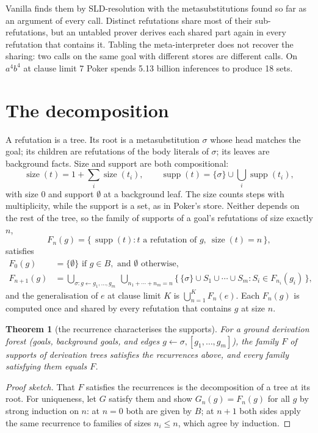 \documentclass[11pt]{article}
\newtheorem{theorem}{Theorem}
\newcommand{\supp}{\operatorname{supp}}
\newcommand{\size}{\operatorname{size}}
\newcommand{\F}{F}
\begin{document}
Vanilla finds them by SLD-resolution with the metasubstitutions found so far as an
argument of every call. Distinct refutations share most of their sub-refutations,
but an untabled prover derives each shared part again in every refutation that
contains it. Tabling the meta-interpreter does not recover the sharing: two calls on
the same goal with different stores are different calls. On $a^4b^4$ at clause limit
7 Poker spends 5.13 billion inferences to produce 18 sets.

\section{The decomposition}\label{sec:decomposition}

A refutation is a tree. Its root is a metasubstitution $\sigma$ whose head matches
the goal; its children are refutations of the body literals of $\sigma$; its leaves
are background facts. Size and support are both compositional:
\[
  \size(t) = 1 + \sum_i \size(t_i), \qquad
  \supp(t) = \{\sigma\} \cup \bigcup_i \supp(t_i),
\]
with size $0$ and support $\emptyset$ at a background leaf. The size counts steps
with multiplicity, while the support is a set, as in Poker's store. Neither depends
on the rest of the tree, so the family of supports of a goal's refutations of size
exactly $n$,
\[
  \F_n(g) = \{\, \supp(t) : t \text{ a refutation of } g,\ \size(t) = n \,\},
\]
satisfies
\begin{align*}
  \F_0(g)     &= \{\emptyset\} \text{ if } g \in B, \text{ and } \emptyset \text{ otherwise},\\
  \F_{n+1}(g) &= \bigcup_{\sigma : g \leftarrow g_1, \ldots, g_m}\
                 \bigcup_{n_1 + \cdots + n_m = n}
                 \bigl\{\, \{\sigma\} \cup S_1 \cup \cdots \cup S_m :
                          S_i \in \F_{n_i}(g_i) \,\bigr\},
\end{align*}
and the generalisation of $e$ at clause limit $K$ is $\bigcup_{n=1}^{K} \F_n(e)$.
Each $\F_n(g)$ is computed once and shared by every refutation that contains $g$ at
size $n$.

\begin{theorem}[the recurrence characterises the supports]
For a ground derivation forest (goals, background goals, and edges
$g \leftarrow \sigma, [g_1, \ldots, g_m]$), the family $\F$ of supports of derivation
trees satisfies the recurrences above, and every family satisfying them equals $\F$.
\end{theorem}

\begin{proof}[Proof sketch]
That $\F$ satisfies the recurrences is the decomposition of a tree at its root. For
uniqueness, let $G$ satisfy them and show $G_n(g) = \F_n(g)$ for all $g$ by strong
induction on $n$: at $n = 0$ both are given by $B$; at $n + 1$ both sides apply the
same recurrence to families of sizes $n_i \le n$, which agree by induction.
\end{proof}
\end{document}
